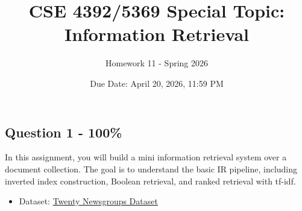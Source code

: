 \documentclass{article}
\begin{document}
\title{CSE 4392/5369 Special Topic: Information Retrieval}
\author{Homework 11 - Spring 2026}
\date{Due Date: April 20, 2026, 11:59 PM}
\maketitle
\thispagestyle{fancy}


\subsection*{Question 1 - 100\%}

In this assignment, you will build a mini information retrieval system over a document collection. The goal is to understand the basic IR pipeline, including inverted index construction, Boolean retrieval, and ranked retrieval with tf-idf.
\begin{itemize}
    \item Dataset: \href{https://archive.ics.uci.edu/static/public/113/twenty%2Bnewsgroups.zip}{Twenty Newsgroups Dataset}

\end{itemize}
\end{document}
